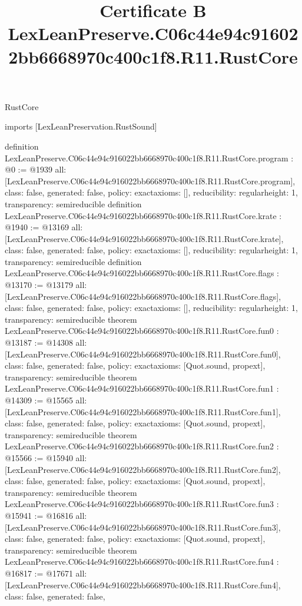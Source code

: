 \begin{lexlean}{RustCore}
\title{Certificate B LexLeanPreserve.C06c44e94c916022bb6668970c400c1f8.R11.RustCore}
\begin{coremodule}
imports [LexLeanPreservation.RustSound]

definition LexLeanPreserve.C06c44e94c916022bb6668970c400c1f8.R11.RustCore.program : @0 := @1939 {
  all: [LexLeanPreserve.C06c44e94c916022bb6668970c400c1f8.R11.RustCore.program],
  class: false,
  generated: false,
  policy: exact{axioms: []},
  reducibility: regular{height: 1},
  transparency: semireducible
}
definition LexLeanPreserve.C06c44e94c916022bb6668970c400c1f8.R11.RustCore.krate : @1940 := @13169 {
  all: [LexLeanPreserve.C06c44e94c916022bb6668970c400c1f8.R11.RustCore.krate],
  class: false,
  generated: false,
  policy: exact{axioms: []},
  reducibility: regular{height: 1},
  transparency: semireducible
}
definition LexLeanPreserve.C06c44e94c916022bb6668970c400c1f8.R11.RustCore.flags : @13170 := @13179 {
  all: [LexLeanPreserve.C06c44e94c916022bb6668970c400c1f8.R11.RustCore.flags],
  class: false,
  generated: false,
  policy: exact{axioms: []},
  reducibility: regular{height: 1},
  transparency: semireducible
}
theorem LexLeanPreserve.C06c44e94c916022bb6668970c400c1f8.R11.RustCore.fun0 : @13187 := @14308 {
  all: [LexLeanPreserve.C06c44e94c916022bb6668970c400c1f8.R11.RustCore.fun0],
  class: false,
  generated: false,
  policy: exact{axioms: [Quot.sound, propext]},
  transparency: semireducible
}
theorem LexLeanPreserve.C06c44e94c916022bb6668970c400c1f8.R11.RustCore.fun1 : @14309 := @15565 {
  all: [LexLeanPreserve.C06c44e94c916022bb6668970c400c1f8.R11.RustCore.fun1],
  class: false,
  generated: false,
  policy: exact{axioms: [Quot.sound, propext]},
  transparency: semireducible
}
theorem LexLeanPreserve.C06c44e94c916022bb6668970c400c1f8.R11.RustCore.fun2 : @15566 := @15940 {
  all: [LexLeanPreserve.C06c44e94c916022bb6668970c400c1f8.R11.RustCore.fun2],
  class: false,
  generated: false,
  policy: exact{axioms: [Quot.sound, propext]},
  transparency: semireducible
}
theorem LexLeanPreserve.C06c44e94c916022bb6668970c400c1f8.R11.RustCore.fun3 : @15941 := @16816 {
  all: [LexLeanPreserve.C06c44e94c916022bb6668970c400c1f8.R11.RustCore.fun3],
  class: false,
  generated: false,
  policy: exact{axioms: [Quot.sound, propext]},
  transparency: semireducible
}
theorem LexLeanPreserve.C06c44e94c916022bb6668970c400c1f8.R11.RustCore.fun4 : @16817 := @17671 {
  all: [LexLeanPreserve.C06c44e94c916022bb6668970c400c1f8.R11.RustCore.fun4],
  class: false,
  generated: false,
}
\end{coremodule}
\end{lexlean}
